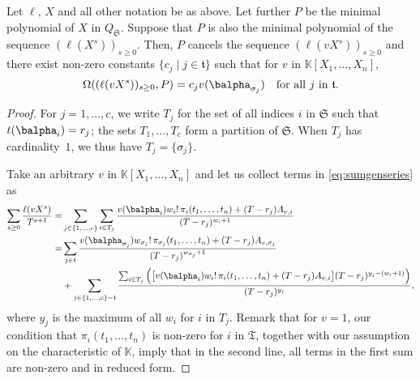\documentclass[12pt]{article}
\newcommand{\minpoly}{P}
\newcommand{\lf}{X}
\def\K{\mathbb{K}}
\def\K {\ensuremath{\mathbb{K}}}
\begin{document}
\begin{lemma} \label{lemma:anyv}
  Let $\ell$, $\lf$ and all other notation be as above. Let further
  $\minpoly$ be the minimal polynomial of $\lf$ in
  $Q_\mathfrak{S}$. Suppose that $\minpoly$ is also the minimal
  polynomial of the sequence $(\ell(\lf^s))_{s \ge 0}$. Then, $\minpoly$
  cancels the sequence $(\ell(v \lf^s))_{s\ge0}$ and
there
  exist non-zero constants $\{c_j \mid j \in \mathfrak{t}\}$ such that
  for $v$ in $\K[X_1,\dots,X_n]$,
  $$\Omega((\ell(v \lf^s))_{s\ge0},\minpoly) = c_{j} v(\balpha_{\sigma_j}) \quad \text{for all $j$ in $\mathfrak{t}$.}$$
\end{lemma}
\begin{proof}
  For $j=1,\dots,c$, we write $T_j$ for the set of all indices $i$ in
  $\mathfrak{S}$ such that $t(\balpha_{i})=r_j$; the sets
  $T_1,\dots,T_c$ form a partition of $\mathfrak{S}$. When $T_j$ has
  cardinality~$1$, we thus have $T_j=\{\sigma_j\}$.
  
  Take an arbitrary $v$ in $\K[X_1,\dots,X_n]$ and let us
  collect terms in \cref{eq:sumgenseries} as
  \begin{align*}
    \sum_{s \ge 0} \frac{\ell(v \lf^s)}{T^{s+1}} =&
    \sum_{j \in \{1,\dots,c\}}
    \sum_{i \in T_j} \frac{
      v(\balpha_{i})   w_{i}!\, \pi_{i}(t_1,\dots,t_n)
      + (T-r_{j} )A_{v,i}}
	{(T-r_{j} )^{w_{i}+1}}\\
	=&
	\sum_{j \in \mathfrak{t}}
	\frac{
	  v(\balpha_{\sigma_{j}})  w_{\sigma_j}!\, \pi_{\sigma_j}(t_1,\dots,t_n)
	  + (T-r_{j}  )A_{v,\sigma_j} }
	     {(T-r_{j} )^{w_{\sigma_j}+1}}\\
	     &+
	     \sum_{j \in \{1,\dots,c\}-\mathfrak{t}}
	     \frac{   \sum_{i \in T_j} \Big( \big[
		 v(\balpha_{i})   w_{i}!\, \pi_{i}(t_1,\dots,t_n)
		 + (T-r_{j}  )A_{v,i} \big ]
	       (T-r_{j} )^{y_j-(w_i+1)}\Big)}
	          {(T-r_{j} )^{y_j}},
  \end{align*}
  where $y_j$ is the maximum of all $w_i$ for $i$ in $T_j$.  Remark
  that for $v=1$, our condition that $\pi_i(t_1,\dots,t_n)$ is
  non-zero for $i$ in $\mathfrak{T}$, together with our assumption on
  the characteristic of $\K$, imply that in the second line, all terms
  in the first sum are non-zero and in reduced form.
  

\end{proof}
\end{document}
